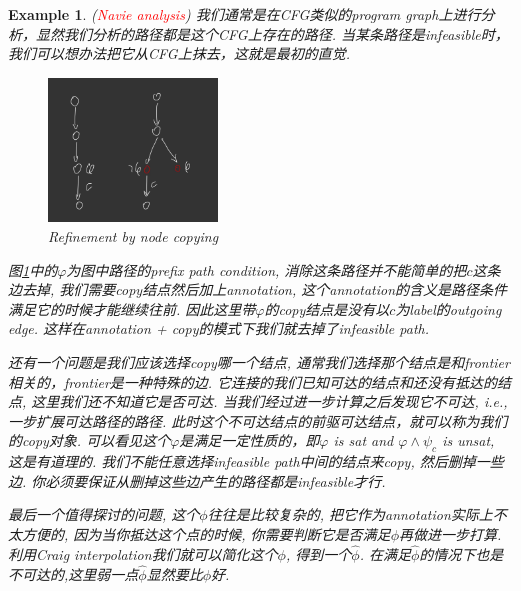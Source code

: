 \documentclass{article}
\newtheorem{example}[theorem]{Example}
\newcommand{\redt}[1]{\textcolor{red}{#1}}
\begin{document}
\begin{example}\label{ex:refine_path1}
\rm (\redt{Navie analysis}) 我们通常是在CFG类似的program graph上进行分析，显然我们分析的路径都是这个CFG上存在的路径. 当某条路径是infeasible时，我们可以想办法把它从CFG上抹去，这就是最初的直觉.
	\begin{figure}[h]
    \centering
    \includegraphics[width=0.4\textwidth]{images/644CA52C-1C17-4714-A076-2AE26418F4CE.jpeg}
    \caption{Refinement by node copying}
    \label{fig:refine1}
    \end{figure}
    图\ref{fig:refine1}中的$\varphi$为图中路径的prefix path condition, 消除这条路径并不能简单的把$c$这条边去掉, 我们需要copy结点然后加上annotation, 这个annotation的含义是路径条件满足它的时候才能继续往前. 因此这里带$\varphi$的copy结点是没有以$c$为label的outgoing edge. 这样在annotation + copy的模式下我们就去掉了infeasible path. 
    
  	还有一个问题是我们应该选择copy哪一个结点, 通常我们选择那个结点是和frontier相关的，frontier是一种特殊的边. 它连接的我们已知可达的结点和还没有抵达的结点, 这里我们还不知道它是否可达. 当我们经过进一步计算之后发现它不可达, i.e., 一步扩展可达路径的路径. 此时这个不可达结点的前驱可达结点，就可以称为我们的copy对象. 可以看见这个$\varphi$是满足一定性质的，即$\varphi$ is sat and $\varphi \wedge \psi_c$ is unsat, 这是有道理的. 我们不能任意选择infeasible path中间的结点来copy, 然后删掉一些边. 你必须要保证从删掉这些边产生的路径都是infeasible才行. 
    
    最后一个值得探讨的问题, 这个$\phi$往往是比较复杂的, 把它作为annotation实际上不太方便的, 因为当你抵达这个点的时候, 你需要判断它是否满足$\phi$再做进一步打算. 利用Craig interpolation我们就可以简化这个$\phi$, 得到一个$\hat{\phi}$. 在满足$\hat{\phi}$的情况下也是不可达的,这里弱一点$\hat{\phi}$显然要比$\phi$好.
    

\end{example}
\end{document}
